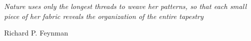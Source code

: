 \thispagestyle{empty}
\section*{}
\vspace{20ex}
\doublespacing
\epigraph{\textit{Nature uses only the longest threads to weave her patterns, so that each small piece of her fabric reveals the organization of the entire tapestry}}{Richard P. Feynman}
